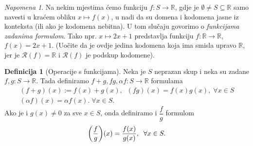 \documentclass{book}
\let\originalleft\left
\let\originalright\right
\renewcommand{\left}{\mathopen{}\mathclose\bgroup\originalleft}
\renewcommand{\right}{\aftergroup\egroup\originalright}
\theoremstyle{definition}
\theoremstyle{definition}
\newtheorem{definition}{Definicija}
\theoremstyle{remark}
\newtheorem{remark}{Napomena}
\begin{document}
\begin{remark}
Na nekim mjestima ćemo funkciju $f : S\to \mathbb{R}$, gdje je $\emptyset\neq S\subseteq \mathbb{R}$ samo navesti u kraćem obliku $x\mapsto f(x)$, u nadi da su domena i kodomena jasne iz konteksta (ili ako je kodomena nebitna). U tom slučaju govorimo o \textit{funkcijama zadanima formulom}. Tako npr. $x\mapsto 2x+1$ predstavlja funkciju $f : \mathbb{R}\to \mathbb{R}$, $f(x)=2x+1$. (Uočite da je ovdje jedina kodomena koja ima smisla upravo $\mathbb{R}$, jer je $\mathcal{R}(f)=\mathbb{R}$ i $\mathcal{R}(f)$ je podskup kodomene).
\end{remark}

\begin{definition}[Operacije s funkcijama]
Neka je $S$ neprazan skup i neka su zadane $f, g : S\to \mathbb{R}$. Tada definiramo $f+g, fg, \alpha f : S\to \mathbb{R}$ formulama
\begin{gather*}
(f+g)(x):=f(x)+g(x),\;\;(fg)(x)=f(x)g(x),\;\forall x\in S\\
(\alpha f)(x)=\alpha f(x).\;\forall x\in S.
\end{gather*}
Ako je i $g(x)\neq 0$ za sve $x\in S$, onda definiramo i $\dfrac{f}{g}$ formulom $$\left(\dfrac{f}{g}\right)(x)=\dfrac{f(x)}{g(x)},\;\;\forall x\in S.$$
\end{definition}
\end{document}
